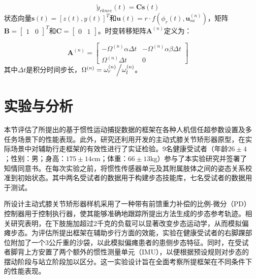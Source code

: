 \begin{equation}
  \label{deqn_ex20}
  {{\tilde y}_{rknee}}(t) = {\mathbf{C}}\pmb{s}(t)
\end{equation}    
状态向量$\pmb{s}(t)={\left[ {z(t),y(t)} \right]^T}$和${\pmb{u}}(t)=r \cdot f({\phi _r}(t),{\pmb{u}}_{sa}^{(n)})$，矩阵${\mathbf{B}={\left[ {\begin{array}{*{20}{c}}1&0 \end{array}} \right]^T}}$和${\mathbf{C}=\left[{\begin{array}{*{20}{c}}0&1 \end{array}} \right]}$。时变转移矩阵${{\mathbf{A}}^{(n)}}$定义为：

\[{{\mathbf{A}}^{(n)}} = \left[ {\begin{array}{*{20}{c}}
{ - {\Omega ^{(n)}}{\alpha}\Delta t}&{ - {\Omega ^{(n)}}{\alpha}{\beta}\Delta t}  \\  
{{\Omega ^{(n)}}\Delta t}&0 
\end{array}} \right]\]    
其中$\Delta t$是积分时间步长，${\Omega ^{(n)}} = {{\omega _r^{(n)}} \mathord{\left/{\vphantom {{\omega _r^{(n)}} {\omega _l^{(n)}}}} \right.\kern-\nulldelimiterspace} {\omega _l^{(n)}}}$。

\section{实验与分析}本节评估了所提出的基于惯性运动捕捉数据的框架在各种人机信任超参数设置及多任务场景下的性能表现。此外，研究还利用开发的主动式膝关节矫形器原型，在实际场景中对辅助行走框架的有效性进行了实证检验。9名健康受试者（年龄$26\pm 4$；性别：男；身高：$175\pm 14$cm；体重：$66\pm13$kg）参与了本实验研究并签署了知情同意书。在每次实验之前，将惯性传感器单元及其附属肢体之间的姿态关系校准到初始状态\cite{tongLSTMBasedLowerLimbs2020}。其中两名受试者的数据用于构建步态技能库，七名受试者的数据用于测试。  

所设计主动式膝关节矫形器样机采用了一种带有前馈重力补偿的比例-微分（PD）控制器用于控制执行器，使其能够准确地跟踪所提出方法生成的步态参考轨迹。相关研究\cite{zanottoAdaptiveAssistasneededController2014a}表明，在下肢施加超过2千克的负载可以显著改变步态运动学，从而模拟偏瘫步态。为评估所提出框架在辅助步行方面的效能，实验在健康受试者的右脚踝部位附加了一个3公斤重的沙袋，以此模拟偏瘫患者的患侧步态特征。同时，在受试者脚背上方安置了两个额外的惯性测量单元（IMU），以便根据预设规则对步态的摆动阶段与站立阶段加以区分。这一实验设计旨在全面考察所提框架在不同条件下的性能表现。


